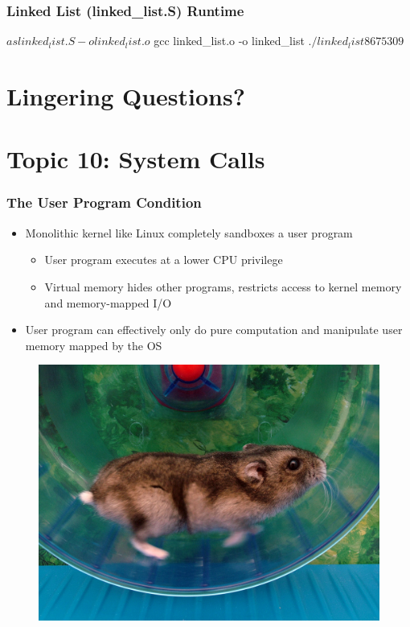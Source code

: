 \documentclass[11pt,xcolor=dvipsnames]{beamer}
\newcommand{\vs}{\vspace{0.5em}}
\newcommand{\mvs}{\vspace{-0.95em}}
\begin{document}
\begin{frame}[fragile,t]
\frametitle{Linked List (linked\_list.S) Runtime}
\mvs
\begin{textcode}
$ as linked_list.S -o linked_list.o
$ gcc linked_list.o -o linked_list
$ ./linked_list
86
75
309
$
\end{textcode}
\end{frame}

\section*{Lingering Questions?}

\section{Topic 10: System Calls}

\begin{frame}[fragile,t]
\frametitle{The User Program Condition}
\begin{itemize}
  \item Monolithic kernel like Linux completely sandboxes a user program
  \begin{itemize}
  \item User program executes at a lower CPU privilege
  \item Virtual memory hides other programs, restricts access to kernel memory and memory-mapped I/O
  \end{itemize}
  \vs \vs
  \pause
  \item User program can effectively only do pure computation and manipulate user memory mapped by the OS
\end{itemize}
\pause
\begin{figure}
\centering
\includegraphics[height=0.40\paperheight]{figures/hamster.jpg}
\end{figure}
\end{frame}
\end{document}

